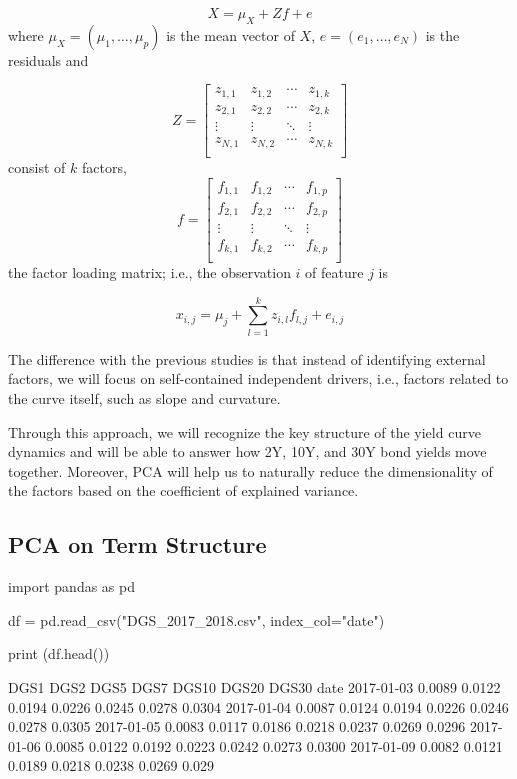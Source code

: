 $$
X = \mu_ X + Zf + e
$$
where $\mu_X = (\mu_1,\ldots, \mu_p)$ is the mean vector of $X$, $e = (e_1,\ldots, e_N )$ is the residuals and

$$
Z =
\begin{bmatrix}
	z_{1,1} & z_{1,2} & \cdots & z_{1,k} \\
	z_{2,1} & z_{2,2} & \cdots & z_{2,k} \\
	\vdots & \vdots & \ddots & \vdots \\
	z_{N,1} & z_{N,2} & \cdots & z_{N,k} \\
\end{bmatrix}
$$
consist of $k$ factors,
$$
f =
\begin{bmatrix}
	f_{1,1} & f_{1,2} & \cdots & f_{1,p} \\
	f_{2,1} & f_{2,2} & \cdots & f_{2,p} \\
	\vdots & \vdots & \ddots & \vdots \\
	f_{k,1} & f_{k,2} & \cdots & f_{k,p} \\
\end{bmatrix}
$$
the factor loading matrix; i.e., the observation $i$ of feature $j$ is

$$
x_{i,j} = \mu_j + \sum_{l=1}^k z_{i,l}f_{l,j} + e_{i,j}
$$

The difference with the previous studies is that instead of identifying external factors, we will focus on self-contained independent drivers, i.e., factors related to the curve itself, such as slope and curvature.

Through this approach, we will recognize the key structure of the yield curve dynamics and will be able to answer how 2Y, 10Y, and 30Y bond yields move together. Moreover, PCA will help us to naturally reduce the dimensionality of the factors based on the coefficient of explained variance.

\subsection{PCA on Term Structure}

\begin{ipython}
import pandas as pd

df = pd.read_csv("DGS_2017_2018.csv", index_col="date")

print (df.head())
\end{ipython}
\begin{ioutput}
              DGS1    DGS2    DGS5    DGS7   DGS10   DGS20   DGS30
date                                                              
2017-01-03  0.0089  0.0122  0.0194  0.0226  0.0245  0.0278  0.0304
2017-01-04  0.0087  0.0124  0.0194  0.0226  0.0246  0.0278  0.0305
2017-01-05  0.0083  0.0117  0.0186  0.0218  0.0237  0.0269  0.0296
2017-01-06  0.0085  0.0122  0.0192  0.0223  0.0242  0.0273  0.0300
2017-01-09  0.0082  0.0121  0.0189  0.0218  0.0238  0.0269  0.029
\end{ioutput}

